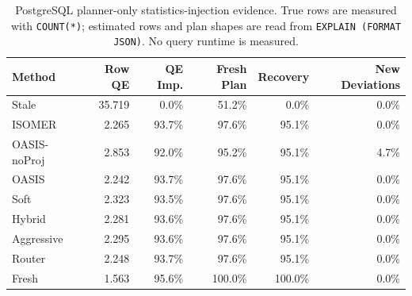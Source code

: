\begin{table}[t]
  \centering
  \small
  \caption{PostgreSQL planner-only statistics-injection evidence. True rows are measured with \texttt{COUNT(*)}; estimated rows and plan shapes are read from \texttt{EXPLAIN (FORMAT JSON)}. No query runtime is measured.}
  \label{tab:postgres_planner_stats_injection}
  \setlength{\tabcolsep}{4pt}
  \begin{tabular}{lrrrrr}
    \toprule
    Method & Row QE & QE Imp. & Fresh Plan & Recovery & New Deviations \\
    \midrule
    Stale & 35.719 & 0.0\% & 51.2\% & 0.0\% & 0.0\% \\
    ISOMER & 2.265 & 93.7\% & 97.6\% & 95.1\% & 0.0\% \\
    OASIS-noProj & 2.853 & 92.0\% & 95.2\% & 95.1\% & 4.7\% \\
    OASIS & 2.242 & 93.7\% & 97.6\% & 95.1\% & 0.0\% \\
    Soft & 2.323 & 93.5\% & 97.6\% & 95.1\% & 0.0\% \\
    Hybrid & 2.281 & 93.6\% & 97.6\% & 95.1\% & 0.0\% \\
    Aggressive & 2.295 & 93.6\% & 97.6\% & 95.1\% & 0.0\% \\
    Router & 2.248 & 93.7\% & 97.6\% & 95.1\% & 0.0\% \\
    Fresh & 1.563 & 95.6\% & 100.0\% & 100.0\% & 0.0\% \\
    \bottomrule
  \end{tabular}
\end{table}
